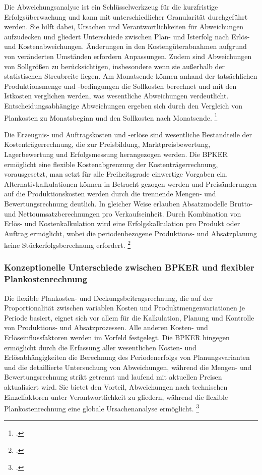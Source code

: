 Die Abweichungsanalyse ist ein Schlüsselwerkzeug für die kurzfristige Erfolgsüberwachung und kann mit unterschiedlicher Granularität durchgeführt werden. Sie hilft dabei, Ursachen und Verantwortlichkeiten für Abweichungen aufzudecken und gliedert Unterschiede zwischen Plan- und Isterfolg nach Erlös- und Kostenabweichungen. Änderungen in den Kostengüterabnahmen aufgrund von veränderten Umständen erfordern Anpassungen. Zudem sind Abweichungen von Sollgrö{\ss}en zu berücksichtigen, insbesondere wenn sie au{\ss}erhalb der statistischen Streubreite liegen. Am Monatsende können anhand der tatsächlichen Produktionsmenge und -bedingungen die Sollkosten berechnet und mit den Istkosten verglichen werden, was wesentliche Abweichungen verdeutlicht. Entscheidungsabhängige Abweichungen ergeben sich durch den Vergleich von Plankosten zu Monatsbeginn und den Sollkosten nach Monatsende. \footcite[Vgl.][S. 305ff]{Artikel_orginal}

Die Erzeugnis- und Auftragskosten und -erlöse sind wesentliche Bestandteile der Kostenträgerrechnung, die zur Preisbildung, Marktpreisbewertung, Lagerbewertung und Erfolgsmessung herangezogen werden. Die BPKER ermöglicht eine flexible Kostenabgrenzung der Kostenträgerrechnung, vorausgesetzt, man setzt für alle Freiheitsgrade einwertige Vorgaben ein. Alternativkalkulationen können in Betracht gezogen werden und Preisänderungen auf die Produktionskosten werden durch die trennende Mengen- und Bewertungsrechnung deutlich. In gleicher Weise erlauben Absatzmodelle Brutto- und Nettoumsatzberechnungen pro Verkaufseinheit. Durch Kombination von Erlös- und Kostenkalkulation wird eine Erfolgskalkulation pro Produkt oder Auftrag ermöglicht, wobei die periodenbezogene Produktions- und Absatzplanung keine Stückerfolgsberechnung erfordert. \footcite[Vgl.][S. 307f]{Artikel_orginal}

\subsubsection{Konzeptionelle Unterschiede zwischen BPKER und flexibler Plankostenrechnung}

Die flexible Plankosten- und Deckungsbeitragsrechnung, die auf der Proportionalität zwischen variablen Kosten und Produktmengenvariationen je Periode basiert, eignet sich vor allem für die Kalkulation, Planung und Kontrolle von Produktions- und Absatzprozessen. Alle anderen Kosten- und Erlöseinflussfaktoren werden im Vorfeld festgelegt. Die BPKER hingegen ermöglicht durch die Erfassung aller wesentlichen Kosten- und Erlösabhängigkeiten die Berechnung des Periodenerfolgs von Planungsvarianten und die detaillierte Untersuchung von Abweichungen, während die Mengen- und Bewertungsrechnung strikt getrennt und laufend mit aktuellen Preisen aktualisiert wird. Sie bietet den Vorteil, Abweichungen nach technischen Einzelfaktoren unter Verantwortlichkeit zu gliedern, während die flexible Plankostenrechnung eine globale Ursachenanalyse ermöglicht. \footcite[Vgl.][S. 308ff]{Artikel_orginal}

